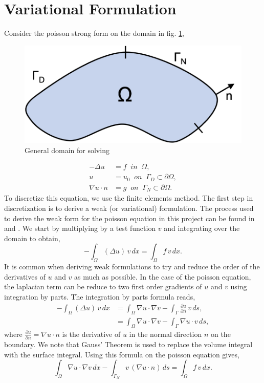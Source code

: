 \section{Variational Formulation}
Consider the poisson strong form on the domain in fig. \ref{Domain},
\begin{figure}[!ht]
\begin{center}
\includegraphics[scale=0.6]{figures/Domain.png}
\end{center}
\caption{General domain for solving}
\label{Domain}
\end{figure}
\begin{align}
-\Delta u &= f \;\; in \;\; \Omega, \\
u &= u_0 \;\; on \;\; \Gamma_D \subset \partial \Omega, \\
\nabla u\cdot n &= g \;\; on \;\; \Gamma_N \subset \partial \Omega.
\label{pde}
\end{align}
To discretize this equation, we use the finite elements method.  The first step in discretization is to derive a weak (or variational) formulation.  The process used to derive the weak form for the poisson equation in this project can be found in \cite{AutomatedFEM2011} and \cite{Fenics2017}.  We start by multiplying by a test function $v$ and integrating over the domain to obtain,
\begin{equation}
-\int_{\Omega} (\Delta u) \, v \, dx = \int_{\Omega} f \, v \, dx.
\end{equation}
It is common when deriving weak formulations to try and reduce the order of the derivatives of $u$ and $v$ as much as possible.  In the case of the poisson equation, the laplacian term can be reduce to two first order gradients of $u$ and $v$ using integration by parts.  The integration by parts formula reads,
\begin{align}
-\int_\Omega (\Delta u) \, v \, dx &= \int_\Omega \nabla u \cdot \nabla v - \int_{\Gamma} \frac{\partial u}{\partial n} \, v \, ds, \\
 &= \int_\Omega \nabla u \cdot \nabla v - \int_{\Gamma} \nabla u \cdot v \, ds,
\end{align}
where $\frac{\partial u}{\partial n} = \nabla u \cdot n$ is the derivative of $u$ in the normal direction $n$ on the boundary.  We note that Gauss' Theorem is used to replace the volume integral with the surface integral.  Using this formula on the poisson equation gives,
\begin{equation}
\int_{\Omega} \nabla u \cdot \nabla v \, dx - \int_{\Gamma_N} v \, (\nabla u \cdot n) \, ds = \int_{\Omega} f \, v \, dx.
\end{equation}

